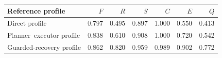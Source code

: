 \begin{tabular}{lrrrrrr}
\toprule
Reference profile & $F$ & $R$ & $S$ & $C$ & $E$ & $Q$ \\
\midrule
Direct profile & 0.797 & 0.495 & 0.897 & 1.000 & 0.550 & 0.413 \\
Planner--executor profile & 0.838 & 0.610 & 0.908 & 1.000 & 0.720 & 0.542 \\
Guarded-recovery profile & 0.862 & 0.820 & 0.959 & 0.989 & 0.902 & 0.772 \\
\bottomrule
\end{tabular}
